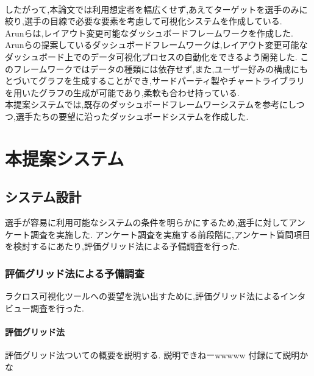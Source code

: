 \documentclass[sotsuron]{kuee}
\begin{document}
	\\したがって,本論文では利用想定者を幅広くせず,あえてターゲットを選手のみに絞り,選手の目線で必要な要素を考慮して可視化システムを作成している.
	\\Arunらは,レイアウト変更可能なダッシュボードフレームワークを作成した.
	Arunらの提案しているダッシュボードフレームワークは,レイアウト変更可能なダッシュボード上でのデータ可視化プロセスの自動化をできるよう開発した.
	このフレームワークではデータの種類には依存せず,また,ユーザー好みの構成にもとづいてグラフを生成することができ,サードパーティ製やチャートライブラリを用いたグラフの生成が可能であり,柔軟も合わせ持っている.
	\\本提案システムでは,既存のダッシュボードフレームワーシステムを参考にしつつ,選手たちの要望に沿ったダッシュボードシステムを作成した.

\chapter{本提案システム}
	\section{システム設計}
		選手が容易に利用可能なシステムの条件を明らかにするため,選手に対してアンケート調査を実施した.
		アンケート調査を実施する前段階に,アンケート質問項目を検討するにあたり,評価グリッド法による予備調査を行った.
		\subsection{評価グリッド法による予備調査}
			ラクロス可視化ツールへの要望を洗い出すために,評価グリッド法によるインタビュー調査を行った.
			\subsubsection{評価グリッド法}
				評価グリッド法ついての概要を説明する.
				説明できねーwwwww
				付録にて説明かな
\end{document}
